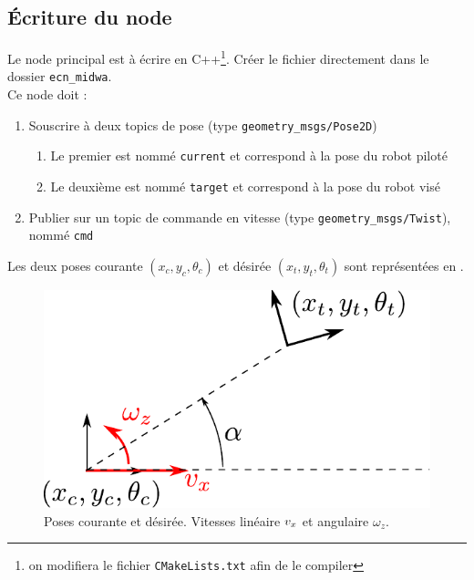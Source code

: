 \documentclass{ecnreport}
\begin{document}
\subsection{Écriture du node}

Le node principal est à écrire en C++\footnote{on modifiera le fichier \texttt{CMakeLists.txt} afin de le compiler}.
Créer le fichier directement dans le dossier \texttt{ecn\_midwa}.\\
Ce node doit :
\begin{enumerate}
 \item Souscrire à deux topics de pose (type \texttt{geometry\_msgs/Pose2D})
 \begin{enumerate}
  \item Le premier est nommé \texttt{current} et correspond à la pose du robot piloté
  \item Le deuxième est nommé \texttt{target} et correspond à la pose du robot visé
 \end{enumerate}
 \item Publier sur un topic de commande en vitesse (type \texttt{geometry\_msgs/Twist}), nommé \texttt{cmd}
\end{enumerate}
\newpage
Les deux poses courante $(x_c,y_c,\theta_c)$ et désirée $(x_t,y_t,\theta_t)$ sont représentées en .
\begin{figure}[h]\centering
 \includegraphics[width=.5\linewidth]{schema}
 \caption{Poses courante et désirée. Vitesses linéaire $v_x$ et angulaire $\omega_z$.}
 \label{schema}
\end{figure}
\end{document}
